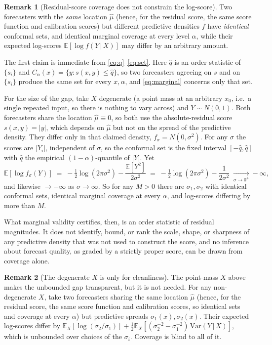 \documentclass[11pt]{article}
\theoremstyle{definition}
\newtheorem{remark}{Remark}
\newcommand{\E}{\mathbb{E}}
\newcommand{\given}{\,\vert\,}
\begin{document}
\begin{remark}[Residual-score coverage does not constrain the log-score]\label{rem:orth}
Two forecasters with the
\emph{same} location $\hat\mu$ (hence, for the residual score, the same score function and
calibration scores) but different predictive densities $f$ have \emph{identical} conformal
sets, and identical marginal coverage at every level $\alpha$, while their expected
log-scores $\E[\log f(Y\given X)]$ may differ by an arbitrary amount.

The first claim is immediate from \eqref{eq:q}--\eqref{eq:set}. Here $\hat q$ is an order
statistic of $\{s_i\}$ and $C_\alpha(x)=\{y:s(x,y)\le\hat q\}$, so two forecasters
agreeing on $s$ and on $\{s_i\}$ produce the same set for every $x,\alpha$, and
\eqref{eq:marginal} concerns only that set.

For the size of the gap, take $X$ degenerate (a point mass at an arbitrary $x_0$, i.e.\ a single
repeated input, so there is nothing to vary across) and $Y\sim N(0,1)$. Both forecasters
share the location
$\hat\mu\equiv 0$, so both use the absolute-residual score $s(x,y)=|y|$, which depends on
$\hat\mu$ but not on the spread of the predictive density. They differ only in that claimed
density, $f_\sigma=N(0,\sigma^2)$. For any $\sigma$ the scores are $|Y_i|$, independent of
$\sigma$, so the conformal set is the fixed interval $[-\hat q,\hat q]$ with $\hat q$ the
empirical $(1-\alpha)$-quantile of $|Y|$. Yet
\[
  \E[\log f_\sigma(Y)] \;=\; -\tfrac12\log(2\pi\sigma^2)-\frac{\E[Y^2]}{2\sigma^2}
  \;=\; -\tfrac12\log(2\pi\sigma^2)-\frac{1}{2\sigma^2}\;\xrightarrow[\sigma\to 0^+]{}-\infty,
\]
and likewise $\to-\infty$ as $\sigma\to\infty$. So for any $M>0$ there are
$\sigma_1,\sigma_2$ with identical conformal sets, identical marginal coverage at every
$\alpha$, and log-scores differing by more than $M$.

What marginal validity certifies, then, is an order statistic of residual magnitudes. It
does not identify, bound, or rank the scale, shape, or sharpness of any predictive density
that was not used to construct the score, and no inference about forecast quality, as graded
by a strictly proper score, can be drawn from coverage alone.
\end{remark}

\begin{remark}[The degenerate $X$ is only for cleanliness]\label{rem:nondeg}
The point-mass $X$ above makes the unbounded gap transparent, but it is not needed.
For any non-degenerate $X$, take two forecasters sharing the same location $\hat\mu$ (hence,
for the residual score, the same score function and calibration scores, so identical sets
and coverage at every $\alpha$) but predictive spreads $\sigma_1(x),\sigma_2(x)$. Their
expected log-scores differ by $\E_X[\log(\sigma_2/\sigma_1)] + \tfrac12\E_X[(\sigma_2^{-2}
-\sigma_1^{-2})\,\mathrm{Var}(Y\given X)]$, which is unbounded over choices of the
$\sigma_i$. Coverage is blind to all of it.
\end{remark}
\end{document}
